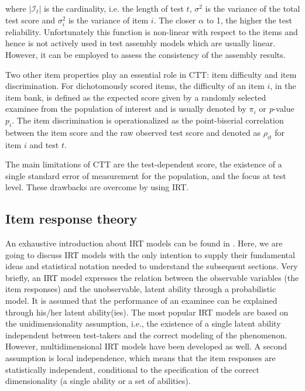 \noindent where $|\mathcal{I}_t|$ is the cardinality, i.e. the length of test $t$, $\sigma^2$ is the variance of the total test score and $\sigma^2_i$ is the variance of item $i$. The closer $\alpha$ to 1, the higher the test reliability. Unfortunately this function is non-linear with respect to the items and hence is not actively used in test assembly models which are usually linear. However, it can be employed to assess the consistency of the assembly results.

Two other item properties play an essential role in CTT: item difficulty and item discrimination. For dichotomously scored items, the difficulty of an item  $i$, in the item bank, is defined as the expected score given by a randomly selected examinee from the population of interest and is usually denoted by $\pi_i$ or \textit{p}-value $p_i$. The item discrimination is operationalized as the point-biserial correlation between the item score and the raw observed test score and denoted as $\rho_{it}$ for item $i$ and test $t$.

The main limitations of CTT are the test-dependent score, the existence of a single standard error of measurement for the population, and the focus at test level. These drawbacks are overcome by using IRT.

\subsection{Item response theory}\label{sec:irt}
An exhaustive introduction about IRT models can be found in \textcite{lord1968statistical, Hamb91}. Here, we are going to discuss IRT models with the only intention to supply their fundamental ideas and statistical notation needed to understand the subsequent sections. Very briefly, an IRT model expresses the relation between the observable variables (the item responses) and the unobservable, latent ability through a probabilistic model. It is assumed that the performance of an examinee can be explained through his/her latent ability(ies). The most popular IRT models are based on the unidimensionality assumption, i.e., the existence of a single latent ability independent between test-takers and the correct modeling of the phenomenon. However, multidimensional IRT models have been developed as well. A second assumption is local independence, which means that the item responses are statistically independent, conditional to the specification of the correct dimensionality (a single ability or a set of abilities).

